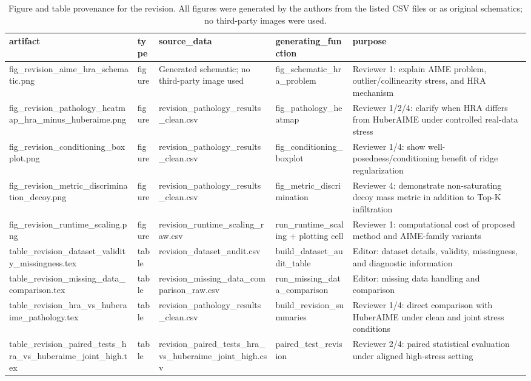 \begin{table}[t]
\centering
\begin{tabular}{lllll}
\toprule
artifact & type & source_data & generating_function & purpose \\
\midrule
fig_revision_aime_hra_schematic.png & figure & Generated schematic; no third-party image used & fig_schematic_hra_problem & Reviewer 1: explain AIME problem, outlier/collinearity stress, and HRA mechanism \\
fig_revision_pathology_heatmap_hra_minus_huberaime.png & figure & revision_pathology_results_clean.csv & fig_pathology_heatmap & Reviewer 1/2/4: clarify when HRA differs from HuberAIME under controlled real-data stress \\
fig_revision_conditioning_boxplot.png & figure & revision_pathology_results_clean.csv & fig_conditioning_boxplot & Reviewer 1/4: show well-posedness/conditioning benefit of ridge regularization \\
fig_revision_metric_discrimination_decoy.png & figure & revision_pathology_results_clean.csv & fig_metric_discrimination & Reviewer 4: demonstrate non-saturating decoy mass metric in addition to Top-K infiltration \\
fig_revision_runtime_scaling.png & figure & revision_runtime_scaling_raw.csv & run_runtime_scaling + plotting cell & Reviewer 1: computational cost of proposed method and AIME-family variants \\
table_revision_dataset_validity_missingness.tex & table & revision_dataset_audit.csv & build_dataset_audit_table & Editor: dataset details, validity, missingness, and diagnostic information \\
table_revision_missing_data_comparison.tex & table & revision_missing_data_comparison_raw.csv & run_missing_data_comparison & Editor: missing data handling and comparison \\
table_revision_hra_vs_huberaime_pathology.tex & table & revision_pathology_results_clean.csv & build_revision_summaries & Reviewer 1/4: direct comparison with HuberAIME under clean and joint stress conditions \\
table_revision_paired_tests_hra_vs_huberaime_joint_high.tex & table & revision_paired_tests_hra_vs_huberaime_joint_high.csv & paired_test_revision & Reviewer 2/4: paired statistical evaluation under aligned high-stress setting \\
\bottomrule
\end{tabular}

\caption{Figure and table provenance for the revision. All figures were generated by the authors from the listed CSV files or as original schematics; no third-party images were used.}
\label{tab:revision_figure_provenance}
\end{table}